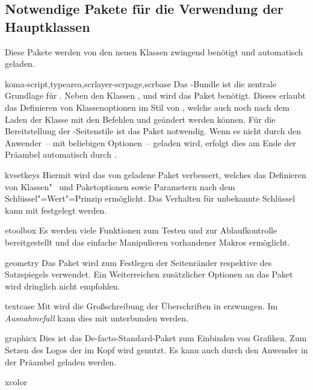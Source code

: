 \subsection{Notwendige Pakete für die Verwendung der Hauptklassen}
Diese Pakete werden von den neuen Klassen zwingend benötigt und automatisch 
geladen.
%
\begin{packages}
\item[koma-script,typearea,scrlayer-scrpage,scrbase]
  Das \KOMAScript-Bundle ist die zentrale Grundlage für \TUDScript. Neben den 
  Klassen ,  und  wird das Paket 
   benötigt. Dieses erlaubt das Definieren von Klassenoptionen 
  im Stil von \KOMAScript, welche auch noch nach dem Laden der Klasse mit den 
  Befehlen  und  geändert werden können. Für 
  die Bereitstellung der -Seitenstile ist das Paket 
   notwendig. Wenn es nicht durch den Anwender~-- mit 
  beliebigen Optionen~-- geladen wird, erfolgt dies am Ende der Präambel 
  automatisch durch \TUDScript.
\item[kvsetkeys]
  Hiermit wird das von  geladene Paket  
  verbessert, welches das Definieren von Klassen"~ und Paketoptionen sowie 
  Parametern nach dem Schlüssel"=Wert"=Prinzip ermöglicht. Das Verhalten für 
  unbekannte Schlüssel  kann mit  festgelegt werden.
\item[etoolbox]
  Es werden viele Funktionen zum Testen und zur Ablaufkontrolle bereitgestellt 
  und das einfache Manipulieren vorhandener Makros ermöglicht.
\item[geometry]
  Das Paket wird zum Festlegen der Seitenränder respektive des Satzspiegels 
  verwendet. Ein Weiterreichen zusätzlicher Optionen an das Paket wird 
  dringlich nicht empfohlen.
\item[textcase]
  Mit  wird die Großschreibung der Überschriften in 
  \DIN erzwungen. Im \emph{Ausnahmefall} kann dies mit  
  unterbunden werden.
\item[graphicx]
  Dies ist das De-facto-Standard-Paket zum Einbinden von Grafiken. Zum Setzen 
  des Logos der \TnUD im Kopf wird  genutzt. Es kann 
  auch durch den Anwender in der Präambel geladen werden.
\item[xcolor]

\end{packages}

